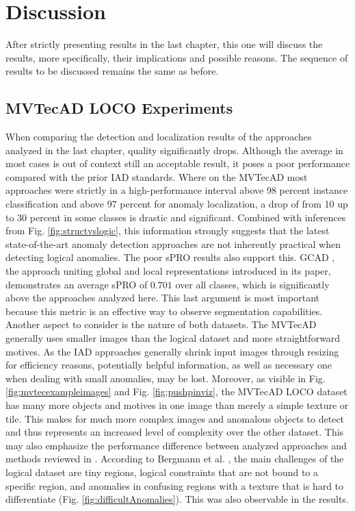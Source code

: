 \chapter{Discussion}
\label{chap:results}

After strictly presenting results in the last chapter, this one will discuss the results, more specifically, their implications and possible reasons. 
The sequence of results to be discussed remains the same as before.


\section{MVTecAD LOCO Experiments}
\label{sec:locoresultssota}

When comparing the detection and localization results of the approaches analyzed in the last chapter, quality significantly drops. 
Although the average in most cases is out of context still an acceptable result, it poses a poor performance compared with the prior 
IAD standards. Where on the MVTecAD \cite{MVTEC_Bergmann_2021} most approaches were strictly in a high-performance interval above 98 percent 
instance classification and above 97 percent for anomaly localization, a drop of from 10 up to 30 percent in some classes is drastic and significant. 
Combined with inferences from Fig. \ref{fig:structvslogic}, this information strongly suggests that the latest state-of-the-art anomaly detection approaches are not inherently practical when detecting logical anomalies. The poor sPRO results also support this. GCAD \cite{LOCODentsAndScratchesBergmann2022}, the approach uniting global and local representations introduced in its 
paper, demonstrates an average sPRO of $0.701$ over all classes, which is significantly above the approaches analyzed here. This last argument is most important because this metric 
is an effective way to observe segmentation capabilities. \newline
Another aspect to consider is the nature of both datasets. The MVTecAD \cite{MVTEC_Bergmann_2021} generally uses smaller images than the 
logical dataset and more straightforward motives. As the IAD approaches generally shrink input images through resizing for efficiency reasons, 
potentially helpful information, as well as necessary one when dealing with small anomalies, may be lost. 
Moreover, as visible in Fig. \ref{fig:mvtecexampleimages} and Fig. \ref{fig:pushpinviz}, the MVTecAD LOCO dataset 
has many more objects and motives in one image than merely a simple texture or tile. This makes for much more complex images and anomalous objects 
to detect and thus represents an increased level of complexity over the other dataset. This may also emphasize the performance 
difference between analyzed approaches and methods reviewed in \cite{LOCODentsAndScratchesBergmann2022}. \newline
According to Bergmann et al. \cite{LOCODentsAndScratchesBergmann2022}, the main challenges of the logical dataset are tiny regions, logical constraints that are 
not bound to a specific region, and anomalies in confusing regions with a texture that is hard to differentiate (Fig. \ref{fig:difficultAnomalies}). This was also observable in the results.

